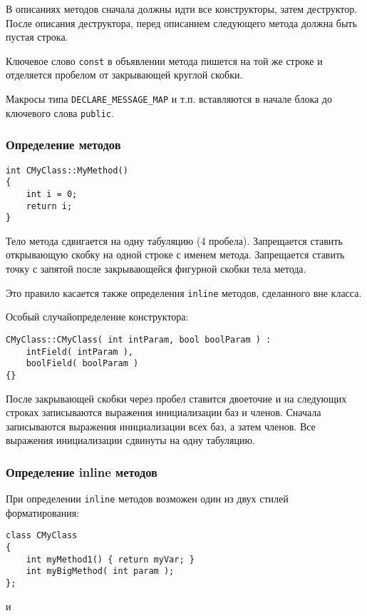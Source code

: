 В описаниях методов сначала должны идти все конструкторы, затем деструктор. После описания деструктора, перед описанием следующего метода должна быть пустая строка.

Ключевое слово \lstinline|const| в объявлении метода пишется на той же строке и отделяется пробелом от закрывающей круглой скобки.

Макросы типа \lstinline|DECLARE_MESSAGE_MAP| и т.п. вставляются в начале блока до ключевого слова \lstinline|public|.

\subsubsection{Определение методов}

\begin{lstlisting}[frame=single]
int CMyClass::MyMethod()
{
    int i = 0;
    return i;
}
\end{lstlisting}

Тело метода сдвигается на одну табуляцию (4 пробела). Запрещается ставить открывающую скобку на одной строке с именем метода. Запрещается ставить точку с запятой после закрывающейся фигурной скобки тела метода.

Это правило касается также определения \lstinline|inline| методов, сделанного вне класса.

Особый случай\mdash определение конструктора:

\begin{lstlisting}[frame=single]
CMyClass::CMyClass( int intParam, bool boolParam ) :
    intField( intParam ),
    boolField( boolParam )
{}
\end{lstlisting}

После закрывающей скобки через пробел ставится двоеточие и на следующих строках записываются выражения инициализации баз и членов. Сначала записываются выражения инициализации всех баз, а затем членов. Все выражения инициализации сдвинуты на одну табуляцию.

\subsubsection{Определение inline методов}

При определении \lstinline|inline| методов возможен один из двух стилей форматирования:

\begin{lstlisting}[frame=single]
class СMyClass
{
    int myMethod1() { return myVar; }
    int myBigMethod( int param );
};
\end{lstlisting}
и

